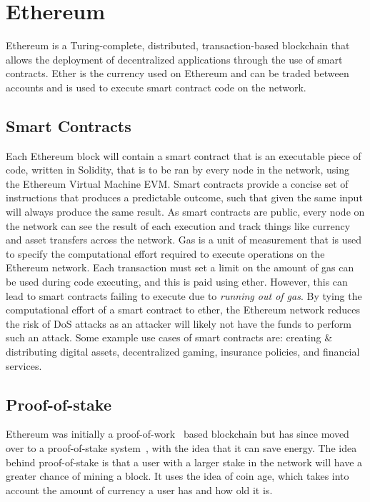 
\section{Ethereum}

Ethereum is a Turing-complete, distributed, transaction-based blockchain that allows the deployment of decentralized applications through the use of smart contracts. Ether is the currency used on Ethereum and can be traded between accounts and is used to execute smart contract code on the network. 

\subsection{Smart Contracts}

Each Ethereum block will contain a smart contract that is an executable piece of code, written in Solidity, that is to be ran by every node in the network, using the Ethereum Virtual Machine EVM. Smart contracts provide a concise set of instructions that produces a predictable outcome, such that given the same input will always produce the same result.
As smart contracts are public, every node on the network can see the result of each execution and track things like currency and asset transfers across the network.
\x
Gas is a unit of measurement that is used to specify the computational effort required to execute operations on the Ethereum network. Each transaction must set a limit on the amount of gas can be used during code executing, and this is paid using ether. However, this can lead to smart contracts failing to execute due to \textit{running out of gas}.
By tying the computational effort of a smart contract to ether, the Ethereum network reduces the risk of DoS attacks as an attacker will likely not have the funds to perform such an attack.
\x
Some example use cases of smart contracts are: creating \& distributing digital assets, decentralized gaming, insurance policies, and financial services.

\subsection{Proof-of-stake}

Ethereum was initially a proof-of-work~\cite{mingxiao_review_2017} based blockchain but has since moved over to a proof-of-stake system~\cite{mingxiao_review_2017}, with the idea that it can save energy. The idea behind proof-of-stake is that a user with a larger stake in the network will have a greater chance of mining a block. It uses the idea of coin age, which takes into account the amount of currency a user has and how old it is.

